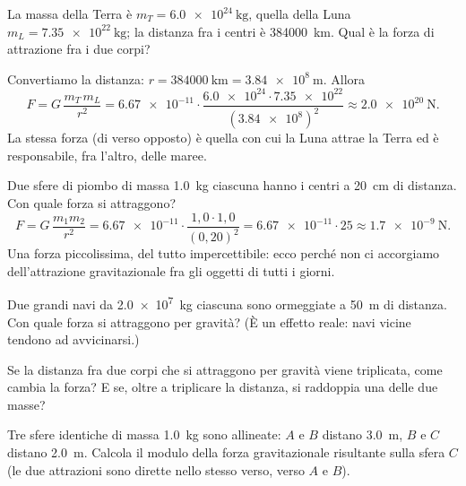 \begin{testexample}
La massa della Terra è $m_T = \SI{6,0e24}{\kilo\gram}$, quella della Luna $m_L = \SI{7,35e22}{\kilo\gram}$; la distanza fra i centri è \SI{384000}{\kilo\metre}. Qual è la forza di attrazione fra i due corpi?

Convertiamo la distanza: $r = \SI{384000}{\kilo\metre} = \SI{3,84e8}{\metre}$. Allora
\[ F = G\,\frac{m_T\,m_L}{r^2} = \num{6,67e-11} \cdot \frac{\num{6,0e24} \cdot \num{7,35e22}}{(\num{3,84e8})^2} \approx \SI{2,0e20}{\newton}. \]
La stessa forza (di verso opposto) è quella con cui la Luna attrae la Terra ed è responsabile, fra l'altro, delle maree.
\end{testexample}

\begin{testexample}
Due sfere di piombo di massa \SI{1,0}{\kilo\gram} ciascuna hanno i centri a \SI{20}{\centi\metre} di distanza. Con quale forza si attraggono?
\[ F = G\,\frac{m_1 m_2}{r^2} = \num{6,67e-11} \cdot \frac{1{,}0 \cdot 1{,}0}{(0{,}20)^2} = \num{6,67e-11} \cdot 25 \approx \SI{1,7e-9}{\newton}. \]
Una forza piccolissima, del tutto impercettibile: ecco perché non ci accorgiamo dell'attrazione gravitazionale fra gli oggetti di tutti i giorni.
\end{testexample}

\begin{esercizio}
Due grandi navi da \SI{2,0e7}{\kilo\gram} ciascuna sono ormeggiate a \SI{50}{\metre} di distanza. Con quale forza si attraggono per gravità? (È un effetto reale: navi vicine tendono ad avvicinarsi.)\\
\end{esercizio}

\begin{esercizio}
Se la distanza fra due corpi che si attraggono per gravità viene triplicata, come cambia la forza? E se, oltre a triplicare la distanza, si raddoppia una delle due masse?\\
\end{esercizio}

\begin{esercizio}
Tre sfere identiche di massa \SI{1,0}{\kilo\gram} sono allineate: $A$ e $B$ distano \SI{3,0}{\metre}, $B$ e $C$ distano \SI{2,0}{\metre}. Calcola il modulo della forza gravitazionale risultante sulla sfera $C$ (le due attrazioni sono dirette nello stesso verso, verso $A$ e $B$).\\
\end{esercizio}

